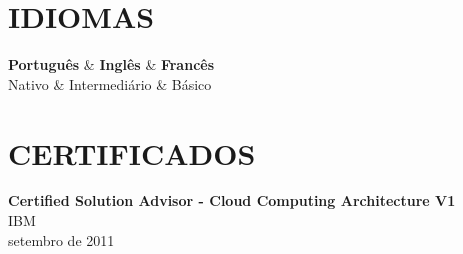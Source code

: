 \documentclass[margin=<value>,11pt]{res} %
\begin{document}
\begin{resume}
\section{IDIOMAS}
	\begin{ncolumn}{3}
	{\bf Português} & {\bf Inglês}        & {\bf Francês} \\
	Nativo    & Intermediário & Básico  \\
	\end{ncolumn}



\section{CERTIFICADOS}
{\bf Certified Solution Advisor - Cloud Computing Architecture V1}\\
IBM\\
setembro de 2011

\end{resume} 
\end{document}
